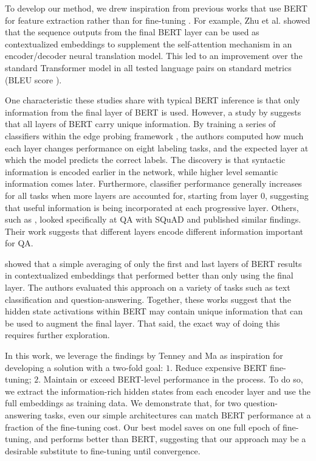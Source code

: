 To develop our method, we drew inspiration from previous works that use BERT for feature extraction rather than for fine-tuning \citep{Zhu2020IncorporatingBI, Chen_2020}. For example, Zhu et al. showed that the sequence outputs from the final BERT layer can be used as contextualized embeddings to supplement the self-attention mechanism in an encoder/decoder neural translation model. This led to an improvement over the standard Transformer model in all tested language pairs on standard metrics (BLEU score \cite{Papineni02bleu:a}).

One characteristic these studies share with typical BERT inference is that only information from the final layer of BERT is used. However, a study by \cite{tenney-etal-2019-bert} suggests that all layers of BERT carry unique information. By training a series of classifiers within the edge probing framework \cite{DBLP:journals/corr/abs-1905-06316}, the authors computed how much each layer changes performance on eight labeling tasks, and the expected layer at which the model predicts the correct labels. The discovery is that syntactic information is encoded earlier in the network, while higher level semantic information comes later. Furthermore, classifier performance generally increases for all tasks when more layers are accounted for, starting from layer 0, suggesting that useful information is being incorporated at each progressive layer. Others, such as \cite{van_Aken_2019}, looked specifically at QA with SQuAD and published similar findings. Their work suggests that different layers encode different information important for QA.

\cite{ma2019universal} showed that a simple averaging of only the first and last layers of BERT results in contextualized embeddings that performed better than only using the final layer. The authors evaluated this approach on a variety of tasks such as text classification and question-answering. Together, these works suggest that the hidden state activations within BERT may contain unique information that can be used to augment the final layer. That said, the exact way of doing this requires further exploration.

In this work, we leverage the findings by Tenney and Ma as inspiration for developing a solution with a two-fold goal: $1.$ Reduce expensive BERT fine-tuning; $2.$ Maintain or exceed BERT-level performance in the process. To do so, we extract the information-rich hidden states from each encoder layer and use the full embeddings as training data. We demonstrate that, for two question-answering tasks, even our simple architectures can match BERT performance at a fraction of the fine-tuning cost. Our best model saves on one full epoch of fine-tuning, and performs better than BERT, suggesting that our approach may be a desirable substitute to fine-tuning until convergence.

\endgroup